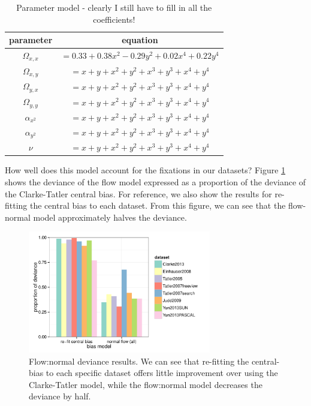 \documentclass[a4paper, onecolumn, oneside, 11pt]{article}
\begin{document}
\begin{table}
\centering
\begin{tabular}{c c}
parameter & equation \\
\hline
$\Omega_{x,x}$	& $= 0.33+ 0.38x^2 -0.29y^2 + 0.02x^4 + 0.22y^4$ \\ 
$\Omega_{x,y}$	& $=x + y + x^2 + y^2 + x^3 + y^3 + x^4 + y^4$ \\ 
$\Omega_{y,x}$	& $=x + y + x^2 + y^2 + x^3 + y^3 + x^4 + y^4$ \\ 
$\Omega_{y,y}$	& $=x + y + x^2 + y^2 + x^3 + y^3 + x^4 + y^4$ \\ 
\hline
$\alpha_{x^2}$		& $=x + y + x^2 + y^2 + x^3 + y^3 + x^4 + y^4$ \\ 
$\alpha_{y^2}$		& $=x + y + x^2 + y^2 + x^3 + y^3 + x^4 + y^4$ \\ 
\hline
$\nu$			& $=x + y + x^2 + y^2 + x^3 + y^3 + x^4 + y^4$ \\ 
\end{tabular}
\caption{Parameter model - clearly I still have to fill in all the coefficients!}
\label{tab:nParamModel}
\end{table}

How well does this model account for the fixations in our datasets? Figure \ref{fig:nFlowDevAll} shows the deviance of the flow model expressed as a proportion of the deviance of the Clarke-Tatler central bias. For reference, we also show the results for re-fitting the central bias to each dataset. From this figure, we can see that the flow-normal model approximately halves the deviance. 

\begin{figure}
\centering
 \includegraphics[width=8cm]{../scripts/flow/figs/llh_ALL.pdf}
\caption{Flow:normal deviance results. We can see that re-fitting the central-bias to each specific dataset offers little improvement over using the Clarke-Tatler model, while the flow:normal model decreases the deviance by half.}
\label{fig:nFlowDevAll}
\end{figure}
\end{document}

